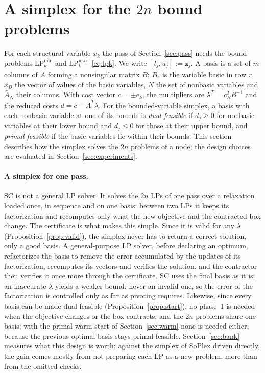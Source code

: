 \documentclass[11pt]{article}
\newcommand{\iv}[1]{\mathbf{#1}}          %
\newcommand{\Abar}{\bar{A}}
\theoremstyle{definition}
\theoremstyle{remark}
\begin{document}
\section{A simplex for the \texorpdfstring{$2n$}{2n} bound problems}\label{sec:simplex}

For each structural variable $x_k$ the pass of Section~\ref{sec:pass} needs
the bound problems $\mathrm{LP}_k^{\min}$ and $\mathrm{LP}_k^{\max}$~\eqref{eq:lpk}. We write $[l_j,u_j]:=\iv{z}_j$.
A basis is a set of $m$ columns of $\Abar$ forming a nonsingular matrix $B$;
$B_r$ is the variable basic in row $r$, $x_B$ the vector of values of the basic
variables, $N$ the set of nonbasic variables and $\Abar_N$ their columns. With
cost vector $c=\pm e_k$, the
multipliers are $\lambda^T = c_B^T B^{-1}$ and the reduced costs
$d = c - \Abar^T\lambda$. For the bounded-variable simplex, a basis with each
nonbasic variable at one of its bounds is \emph{dual feasible} if $d_j\ge 0$ for
nonbasic variables at their lower bound and $d_j\le 0$ for those at their upper
bound, and \emph{primal feasible} if the basic variables lie within their
bounds. This section describes how the simplex solves the $2n$ problems of a
node; the design choices are evaluated in Section~\ref{sec:experiments}.

\paragraph{A simplex for one pass.} SC is not a general LP solver. It
solves the $2n$ LPs of one pass over a relaxation loaded once, in sequence and
on one basis: between two LPs it keeps its factorization and recomputes only
what the new objective and the contracted box change. The certificate is
what makes this simple. Since it is valid for any $\lambda$
(Proposition~\ref{prop:valid}), the simplex never has to return a correct
solution, only a good basis. A
general-purpose LP solver, before declaring an optimum, refactorizes the basis
to remove the error accumulated by the updates of its factorization,
recomputes its vectors and verifies the solution, and the contractor then
verifies it once more through the certificate. SC uses the final basis as it
is: an inaccurate $\lambda$ yields a weaker bound, never an invalid one, so the
error of the factorization is controlled only as far as pivoting requires.
Likewise, since every basis can be made dual feasible
(Proposition~\ref{prop:start}), no phase~1 is needed when the objective changes
or the box contracts, and the $2n$ problems share one basis; with the primal
warm start of Section~\ref{sec:warm} none is needed either, because the
previous optimal basis stays primal feasible. Section~\ref{sec:bank} measures
what this design is worth: against the simplex of SoPlex driven directly, the
gain comes mostly from not preparing each LP as a new problem, more than from
the omitted checks.
\end{document}
